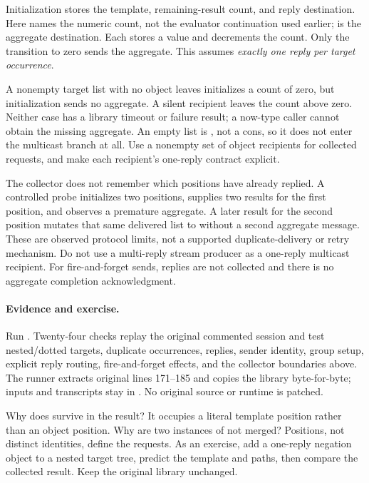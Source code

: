 Initialization stores the template, remaining-result count, and reply
destination. Here  names the numeric count, not the evaluator
continuation used earlier;  is the aggregate destination.
Each  stores a value and decrements the count.
Only the transition to zero sends the aggregate. This assumes
\emph{exactly one reply per target occurrence}.

A nonempty target list with no object leaves initializes a count of zero,
but initialization sends no aggregate. A silent recipient leaves the
count above zero. Neither case has a library timeout or failure result;
a now-type caller cannot obtain the missing aggregate. An empty list is
, not a cons, so it does not enter the multicast branch at all.
Use a nonempty set of object recipients for collected requests, and make
each recipient's one-reply contract explicit.

The collector does not remember which positions have already replied.
A controlled probe initializes two positions, supplies two results for
the first position, and observes a premature  aggregate.
A later result for the second position mutates that same delivered list
to  without a second aggregate message. These are observed
protocol limits, not a supported duplicate-delivery or retry mechanism.
Do not use a multi-reply stream producer as a one-reply multicast recipient.
For fire-and-forget sends, replies are not collected and there is no
aggregate completion acknowledgment.

\paragraph{Evidence and exercise.}
Run . Twenty-four checks replay
the original commented session and test nested/dotted targets, duplicate
occurrences,  replies, sender identity, group setup, explicit
reply routing, fire-and-forget effects, and the collector boundaries above.
The runner extracts original lines 171--185 and copies the library
byte-for-byte; inputs and transcripts stay in .
No original source or runtime is patched.

Why does  survive in the result? It occupies a literal
template position rather than an object position. Why are two instances
of  not merged? Positions, not distinct identities, define
the requests. As an exercise, add a one-reply negation object to a nested
target tree, predict the template and paths, then compare the collected
result. Keep the original library unchanged.
